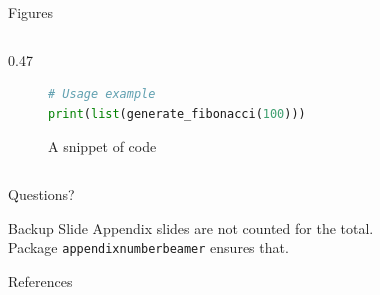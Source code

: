 \documentclass[11pt, aspectratio=169]{beamer}
\begin{document}
\begin{frame}[fragile]{Figures}
\begin{columns}
\begin{column}{0.47\textwidth}
\begin{figure}
\begin{lstlisting}[language=Python]
# Usage example
print(list(generate_fibonacci(100)))
    \end{lstlisting}
        \caption{A snippet of code}
        \end{figure}
        \end{column}
    \end{columns}   
\end{frame}

\begin{frame}[standout]
    Questions?
\end{frame}

\appendix
\begin{frame}{Backup Slide}
    Appendix slides are not counted for the total.\\
    Package \texttt{appendixnumberbeamer} ensures that.
\end{frame}


\begin{frame}[allowframebreaks]{References}
    \nocite{*}
    
    
\end{frame}


\end{document}
